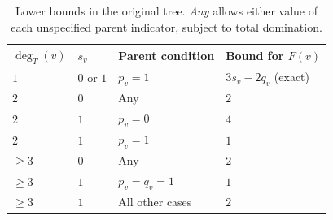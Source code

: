 \documentclass[11pt,a4paper]{article}
\theoremstyle{remark}
\begin{document}
\begin{table}[htbp]
\centering
\renewcommand{\arraystretch}{1.15}
\begin{tabular}{@{}llll@{}}
\toprule
$\deg_T(v)$ & $s_v$ & Parent condition & Bound for $F(v)$\\
\midrule
$1$ & $0$ or $1$ & $p_v=1$ & $3s_v-2q_v$ (exact)\\
$2$ & $0$ & Any & $2$\\
$2$ & $1$ & $p_v=0$ & $4$\\
$2$ & $1$ & $p_v=1$ & $1$\\
$\ge 3$ & $0$ & Any & $2$\\
$\ge 3$ & $1$ & $p_v=q_v=1$ & $1$\\
$\ge 3$ & $1$ & All other cases & $2$\\
\bottomrule
\end{tabular}
\caption{Lower bounds in the original tree. \emph{Any} allows either value
of each unspecified parent indicator, subject to total domination.}
\label{tab:states}
\end{table}
\end{document}
